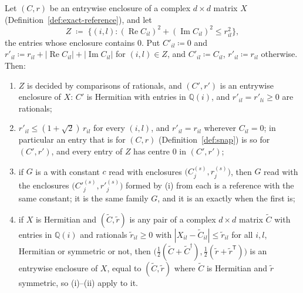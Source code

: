 \begin{lemma}\label{lem:recentred-enclosure}
Let $(C,r)$ be an entrywise enclosure of a complex $d\times d$ matrix $X$
(Definition~\ref{def:exact-reference}), and let
\begin{equation*}
  Z\;\coloneqq\;\big\{(i,l):(\operatorname{Re}C_{il})^{2}
     +(\operatorname{Im}C_{il})^{2}\le r_{il}^{2}\big\},
\end{equation*}
the entries whose enclosure contains $0$. Put $C'_{il}\coloneqq0$ and
$r'_{il}\coloneqq r_{il}+|\operatorname{Re}C_{il}|+|\operatorname{Im}C_{il}|$
for $(i,l)\in Z$, and $C'_{il}\coloneqq C_{il}$, $r'_{il}\coloneqq r_{il}$
otherwise. Then:
\begin{enumerate}[label=(\roman*),leftmargin=2.4em]
\item $Z$ is decided by comparisons of rationals, and $(C',r')$ is an
  entrywise enclosure of $X$: $C'$ is Hermitian with entries in
  $\mathbb{Q}(i)$, and $r'_{il}=r'_{li}\ge0$ are rationals;
\item $r'_{il}\le(1+\sqrt2)\,r_{il}$ for every $(i,l)$, and $r'_{il}=r_{il}$
  wherever $C_{il}=0$; in particular an entry that is
   for $(C,r)$ (Definition~\ref{def:snap}) is so
  for $(C',r')$, and every entry of $Z$ has centre $0$ in $(C',r')$;
\item if $G$ is a  with constant $c$ read with enclosures
  $\big(C^{(s)}_j,r^{(s)}_j\big)$, then $G$ read with the enclosures
  $\big(C'^{(s)}_j,r'^{(s)}_j\big)$ formed by (i) from each is a reference
  with the same constant; it is the same family $G$, and it is an
   exactly when the first is;
\item if $X$ is Hermitian and $(\tilde C,\tilde r)$ is any pair of a complex
  $d\times d$ matrix $\tilde C$ with entries in $\mathbb{Q}(i)$ and rationals
  $\tilde r_{il}\ge0$ with $|X_{il}-\tilde C_{il}|\le\tilde r_{il}$ for all
  $i,l$, Hermitian or symmetric or not, then
  $\big(\tfrac12(\tilde C+\tilde C^{\dagger}),\tfrac12(\tilde r+\tilde r^{\mathsf T})\big)$
  is an entrywise enclosure of $X$, equal to $(\tilde C,\tilde r)$ where
  $\tilde C$ is Hermitian and $\tilde r$ symmetric, so (i)--(ii) apply to
  it.
\end{enumerate}
\end{lemma}

